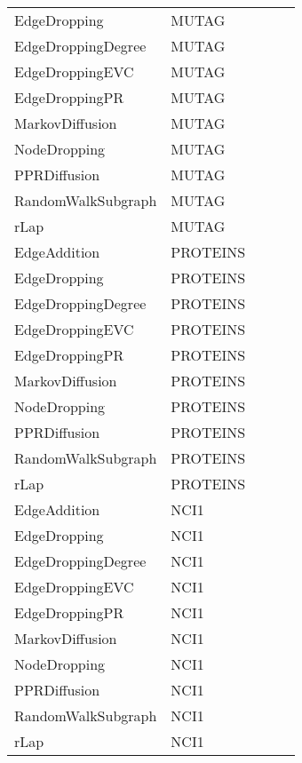 \documentclass{article}
\theoremstyle{plain}
\theoremstyle{definition}
\theoremstyle{remark}
\begin{document}
\begin{table}[H]
\begin{center}
\begin{small}
\begin{sc}
\begin{tabular}{llll|l}
      EdgeDropping &        MUTAG &      &       &   \\
EdgeDroppingDegree &        MUTAG &      &    &   \\
   EdgeDroppingEVC &        MUTAG &   &    &   \\
    EdgeDroppingPR &        MUTAG &      &    &    \\
   MarkovDiffusion &        MUTAG &    &    &   \\
      NodeDropping &        MUTAG &      &       &   \\
      PPRDiffusion &        MUTAG &    &    &    \\
RandomWalkSubgraph &        MUTAG &       &       &   \\          
              rLap &        MUTAG &      &       &   \\
              \midrule
      EdgeAddition &     PROTEINS &      &    &   \\
      EdgeDropping &     PROTEINS &        &    &    \\
EdgeDroppingDegree &     PROTEINS &     &    &   \\
   EdgeDroppingEVC &     PROTEINS &   &    &   \\
    EdgeDroppingPR &     PROTEINS &       &    &   \\
   MarkovDiffusion &     PROTEINS &   &   &   \\
      NodeDropping &     PROTEINS &       &    &   \\
      PPRDiffusion &     PROTEINS &   &    &    \\
RandomWalkSubgraph &     PROTEINS &       &    &   \\
              rLap &     PROTEINS &      &    &   \\
              \midrule
      EdgeAddition &         NCI1 &      &    &    \\
      EdgeDropping &         NCI1 &      &    &   \\
EdgeDroppingDegree &         NCI1 &      &    &   \\
   EdgeDroppingEVC &         NCI1 &   &    &   \\
    EdgeDroppingPR &         NCI1 &      &    &   \\
   MarkovDiffusion &         NCI1 &      &   &     \\
      NodeDropping &         NCI1 &      &     &   \\
      PPRDiffusion &         NCI1 &    &    &    \\
RandomWalkSubgraph &         NCI1 &      &    &   \\
              rLap &         NCI1 &      &     &   \\
\bottomrule
\end{tabular}
\end{sc}
\end{small}
\end{center}
\vskip -0.1in
\end{table}
\pagebreak
\end{document}
